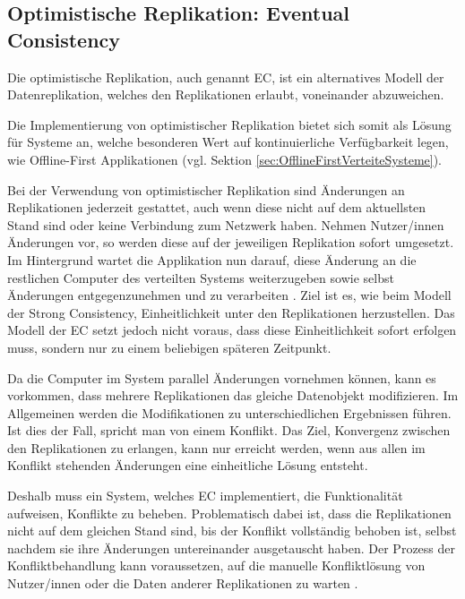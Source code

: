 \documentclass[a4paper, 12pt]{scrreprt}
\begin{document}
\subsection{Optimistische Replikation: Eventual Consistency}

Die optimistische Replikation, auch genannt \acf{EC}, ist ein alternatives Modell der Datenreplikation, welches den Replikationen erlaubt, voneinander abzuweichen.

Die Implementierung von optimistischer Replikation bietet sich somit als Lösung für Systeme an, welche besonderen Wert auf kontinuierliche Verfügbarkeit legen, wie Offline-First Applikationen (vgl. Sektion \ref{sec:OfflineFirstVerteiteSysteme}). 

Bei der Verwendung von optimistischer Replikation sind Änderungen an Replikationen jederzeit gestattet, auch wenn diese nicht auf dem aktuellsten Stand sind oder keine Verbindung zum Netzwerk haben. Nehmen Nutzer/innen Änderungen vor, so werden diese auf der jeweiligen Replikation sofort umgesetzt. Im Hintergrund wartet die Applikation nun darauf, diese Änderung an die restlichen Computer des verteilten Systems weiterzugeben sowie selbst Änderungen entgegenzunehmen und zu verarbeiten \autocite[S. 46]{ArticleOptimisticReplication}. Ziel ist es, wie beim Modell der Strong Consistency, Einheitlichkeit unter den Replikationen herzustellen. Das Modell der \ac{EC} setzt jedoch nicht voraus, dass diese Einheitlichkeit sofort erfolgen muss, sondern nur zu einem beliebigen späteren Zeitpunkt. 

Da die Computer im System parallel Änderungen vornehmen können, kann es vorkommen, dass mehrere Replikationen das gleiche Datenobjekt modifizieren. Im Allgemeinen werden die Modifikationen zu unterschiedlichen Ergebnissen führen. Ist dies der Fall, spricht man von einem Konflikt. Das Ziel, Konvergenz zwischen den Replikationen zu erlangen, kann nur erreicht werden, wenn aus allen im Konflikt stehenden Änderungen eine einheitliche Lösung entsteht.

Deshalb muss ein System, welches \ac{EC} implementiert, die Funktionalität aufweisen, Konflikte zu beheben. Problematisch dabei ist, dass die Replikationen nicht auf dem gleichen Stand sind, bis der Konflikt vollständig behoben ist, selbst nachdem sie ihre Änderungen untereinander ausgetauscht haben. Der Prozess der Konfliktbehandlung kann voraussetzen, auf die manuelle Konfliktlösung von Nutzer/innen oder die Daten anderer Replikationen zu warten \autocite[S.~174-175]{ArticleEventualConsistencyConflicts}.
\end{document}
